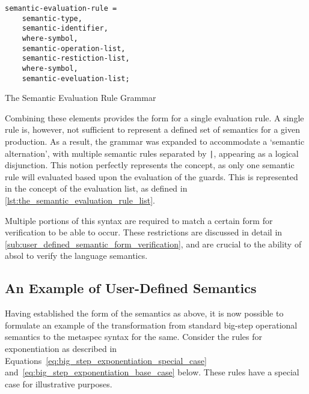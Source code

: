 \begin{listing}[!htb]
\begin{verbatim}
semantic-evaluation-rule = 
    semantic-type,
    semantic-identifier,
    where-symbol,
    semantic-operation-list,
    semantic-restiction-list,
    where-symbol, 
    semantic-eveluation-list;
\end{verbatim}
\caption{The Semantic Evaluation Rule Grammar}
\label{lst:the_semantic_evaluation_rule_grammar}
\end{listing}

Combining these elements provides the form for a single evaluation rule.
A single rule is, however, not sufficient to represent a defined set of semantics for a given production. 
As a result, the grammar was expanded to accommodate a `semantic alternation', with multiple semantic rules separated by \texttt{|}, appearing as a logical disjunction.
This notion perfectly represents the concept, as only one semantic rule will evaluated based upon the evaluation of the guards. 
This is represented in the concept of the evaluation list, as defined in \autoref{lst:the_semantic_evaluation_rule_list}.


Multiple portions of this syntax are required to match a certain form for verification to be able to occur. 
These restrictions are discussed in detail in \autoref{sub:user_defined_semantic_form_verification}, and are crucial to the ability of \gls{absol} to verify the language semantics.


\subsection{An Example of User-Defined Semantics} %
\label{sub:an_example_of_user_defined_semantics}
Having established the form of the semantics as above, it is now possible to formulate an example of the transformation from standard big-step operational semantics to the \gls{metaspec} syntax for the same.
Consider the rules for exponentiation as described in Equations~\ref{eq:big_step_exponentiation_special_case} and~\ref{eq:big_step_exponentiation_base_case} below.
These rules have a special case for illustrative purposes. 

